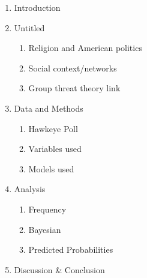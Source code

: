 \documentclass{article}
\begin{document}
\begin{enumerate}
\item Introduction

\item Untitled
  \begin{enumerate}
  \item Religion and American politics
  \item Social context/networks
  \item Group threat theory link
  \end{enumerate}
  
\item Data and Methods
  \begin{enumerate}
  \item Hawkeye Poll
  \item Variables used
  \item Models used
  \end{enumerate}
  
\item Analysis
  \begin{enumerate}
  \item Frequency
  \item Bayesian
  \item Predicted Probabilities
  \end{enumerate}
  
\item Discussion \& Conclusion

\end{enumerate}
\end{document}
